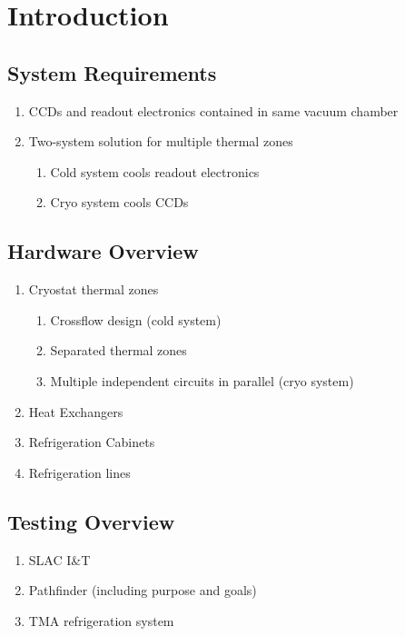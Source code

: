 \section{Introduction}

\subsection{System Requirements}
	\begin{enumerate}
		\item CCDs and readout electronics contained in same vacuum chamber
		\item Two-system solution for multiple thermal zones
		\begin{enumerate}
			\item Cold system cools readout electronics
			\item Cryo system cools CCDs
		\end{enumerate}
	\end{enumerate}

\subsection{Hardware Overview}
	\begin{enumerate}
		\item Cryostat thermal zones
		\begin{enumerate}
			\item Crossflow design (cold system)
			\item Separated thermal zones
			\item Multiple independent circuits in parallel (cryo system)
		\end{enumerate}
		\item Heat Exchangers
		\item Refrigeration Cabinets
		\item Refrigeration lines
	\end{enumerate}

\subsection{Testing Overview}
	\begin{enumerate}
		\item SLAC I\&T
		\item Pathfinder (including purpose and goals) 
		\item TMA refrigeration system
	\end{enumerate}
 

